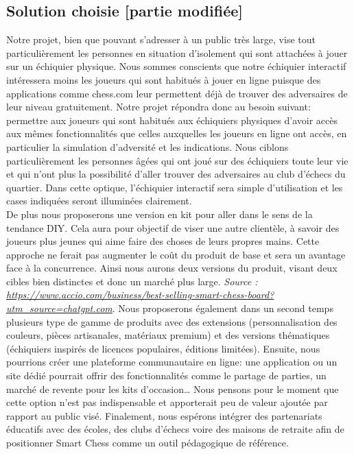 \documentclass{article}
\begin{document}
\subsection{Solution choisie [partie modifiée]}
Notre projet, bien que pouvant s'adresser à un public très large, vise tout particulièrement les personnes en situation d'isolement qui sont attachées à jouer sur un échiquier physique. Nous sommes conscients que notre échiquier interactif intéressera moins les joueurs qui sont habitués à jouer en ligne puisque des applications comme chess.com leur permettent déjà de trouver des adversaires de leur niveau gratuitement. Notre projet répondra donc au besoin suivant: permettre aux joueurs qui sont habitués aux échiquiers physiques d'avoir accès aux mêmes fonctionnalités que celles auxquelles les joueurs en ligne ont accès, en particulier la simulation d'adversité et les indications. Nous ciblons particulièrement les personnes âgées qui ont joué sur des échiquiers toute leur vie et qui n'ont plus la possibilité d'aller trouver des adversaires au club d'échecs du quartier. Dans cette optique, l'échiquier interactif sera simple d'utilisation et les cases indiquées seront illuminées clairement. \\
De plus nous proposerons une version en kit pour aller dans le sens de la tendance DIY. Cela aura pour objectif de viser une autre clientèle, à savoir des joueurs plus jeunes qui aime faire des choses de leurs propres mains. Cette approche ne ferait pas augmenter le coût du produit de base et sera un avantage face à la concurrence. Ainsi nous aurons deux versions du produit, visant deux cibles bien distinctes et donc un marché plus large. 
\textit{Source : \url{https://www.accio.com/business/best-selling-smart-chess-board?utm_source=chatgpt.com}}.
Nous proposerons également dans un second temps plusieurs type de gamme de produits avec des extensions (personnalisation des couleurs, pièces artisanales, matériaux premium) et des versions thématiques (échiquiers inspirés de licences populaires, éditions limitées).  
Ensuite, nous pourrions créer une plateforme communautaire en ligne: une application ou un site dédié pourrait offrir des fonctionnalités comme le partage de parties, un marché de revente pour les kits d’occasion… Nous pensons pour le moment que cette option n'est pas indispensable et apporterait peu de valeur ajoutée par rapport au public visé. 
Finalement, nous espérons intégrer des partenariats éducatifs avec des écoles, des clubs d’échecs voire des maisons de retraite afin de positionner Smart Chess comme un outil pédagogique de référence.
\end{document}
